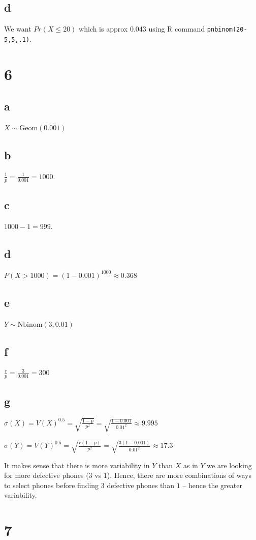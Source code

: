 \documentclass[10pt]{article}
\begin{document}
\subsection*{d}
We want $Pr(X\le20)$ which is approx $0.043$ using R command \texttt{pnbinom(20-5,5,.1)}.

\section*{6}
\subsection*{a}
$X\sim\text{Geom}(0.001)$
\subsection*{b}
$\frac{1}{p}=\frac{1}{0.001}=1000.$
\subsection*{c}
$1000-1=999.$
\subsection*{d}
$P(X>1000)=(1-0.001)^{1000}\approx0.368$
\subsection*{e}
$Y\sim\text{Nbinom}(3, 0.01)$
\subsection*{f}
$\frac{r}{p}=\frac{3}{0.001}=300$
\subsection*{g}
$\sigma(X) = V(X)^{0.5} = \sqrt{\frac{1-p}{p^2}} = \sqrt{\frac{1-0.001}{0.01^2}}\approx 9.995$

\noindent
$\sigma(Y) = V(Y)^{0.5} = \sqrt{\frac{r(1-p)}{p^2}}= \sqrt{\frac{3(1-0.001)}{0.01^2}}\approx17.3$

It makes sense that there is more variability in $Y$ than $X$ as in $Y$ we are looking for more defective phones ($3$ vs $1$). Hence, there are more combinations of ways to select phones before finding $3$ defective phones than $1$ -- hence the greater variability.

\section*{7}
\end{document}
